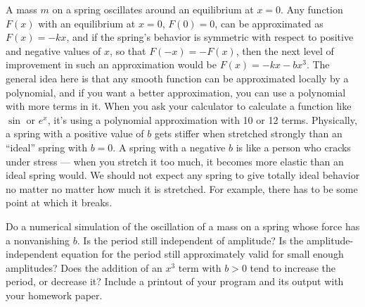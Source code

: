         A mass $m$ on a spring oscillates around an equilibrium at $x=0$. Any function $F(x)$
        with an equilibrium at $x=0$, $F(0)=0$, can be approximated as  $F(x)=-kx$,
        and if the spring's behavior
        is symmetric with respect to positive and negative values of $x$, so that $F(-x)=-F(x)$, then the next
        level of improvement in such an approximation would be $F(x)=-kx-bx^3$.
        The general idea here is that any smooth function
        can be approximated locally by a polynomial, and if you want a better approximation,
        you can use a polynomial with more terms in it. When you ask your calculator
        to calculate a function like $\sin$ or $e^x$, it's using a polynomial approximation
        with 10 or 12 terms. Physically,
        a spring with a positive value of $b$ gets stiffer when stretched strongly
        than an ``ideal'' spring with $b=0$. A spring with a negative $b$ is like a person
        who cracks under stress --- when you stretch it too much, it becomes more elastic
        than an ideal spring would. We should not expect any spring to give totally ideal
        behavior no matter no matter how much it is stretched. For example, there has to be
        some point at which it breaks.

        Do a numerical simulation of the oscillation of a mass on a spring whose
        force has a nonvanishing $b$. Is the
        period still independent of amplitude? Is the amplitude-independent equation
        for the period still approximately valid for small enough amplitudes? Does the
        addition of an $x^3$ term with $b>0$ tend to increase the period, or decrease it?
        Include a printout of your program and its output with your homework paper.
